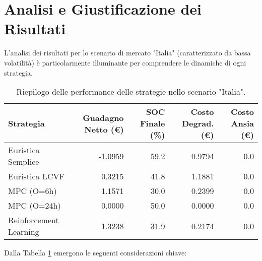 \documentclass[11pt, a4paper]{article}
\begin{document}
\section{Analisi e Giustificazione dei Risultati}
L'analisi dei risultati per lo scenario di mercato "Italia" (caratterizzato da bassa volatilità) è particolarmente illuminante per comprendere le dinamiche di ogni strategia.

\begin{table}[H]
\centering
\caption{Riepilogo delle performance delle strategie nello scenario "Italia".}
\label{tab:risultati}
\begin{tabular}{lrrrr}
\toprule
\textbf{Strategia} & \textbf{Guadagno Netto (€)} & \textbf{SOC Finale (\%)} & \textbf{Costo Degrad. (€)} & \textbf{Costo Ansia (€)} \\
\midrule
Euristica Semplice      & -1.0959 & 59.2 & 0.9794 & 0.0 \\
Euristica LCVF          &  0.3215 & 41.8 & 1.1881 & 0.0 \\
MPC (O=6h)              &  1.1571 & 30.0 & 0.2399 & 0.0 \\
MPC (O=24h)             &  0.0000 & 50.0 & 0.0000 & 0.0 \\
Reinforcement Learning  &  1.3238 & 31.9 & 0.2174 & 0.0 \\
\bottomrule
\end{tabular}
\end{table}

Dalla Tabella \ref{tab:risultati} emergono le seguenti considerazioni chiave:
\end{document}
